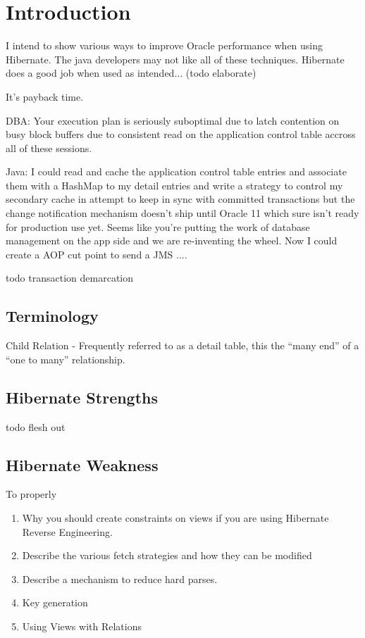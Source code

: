 \section{Introduction}
I intend to show various ways to improve Oracle performance when using Hibernate.  The java developers may not like all of these
techniques.   Hibernate does a good job when used as intended... (todo elaborate) 

It's payback time.  

DBA: Your execution plan is seriously suboptimal due to latch contention on busy block buffers due to consistent read on the application 
control table accross all of these sessions.

Java: I could read and cache the application control table entries and associate them with a HashMap to my detail entries and write a strategy
to control my secondary cache in attempt to keep in sync with committed transactions but the change notification mechanism doesn't ship until
Oracle 11 which sure isn't ready for production use yet.  Seems like you're putting the work of database management on the app side and we are
re-inventing the wheel.  Now I could create a AOP cut point to send a JMS ....


todo transaction demarcation 

\subsection{Terminology}
Child Relation - Frequently referred to as a detail table, this the ``many end'' of a ``one to many'' relationship.  

\subsection{Hibernate Strengths}
todo flesh out
\subsection{Hibernate Weakness}
To properly 


\begin{enumerate}
 \item Why you should create constraints on views if you are using Hibernate Reverse Engineering.
 \item Describe the various fetch strategies and how they can be modified
 \item Describe a mechanism to reduce hard parses. 
 \item Key generation
 \item Using Views with Relations   
 
\end{enumerate}

